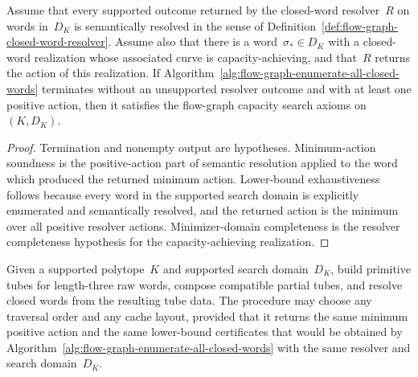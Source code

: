 \begin{unverified}
\begin{proposition}%
\label{prop:enumerate-all-closed-words-satisfies-axioms}
Assume that every supported outcome returned by the closed-word resolver~$R$ on
words in~$D_K$ is semantically resolved in the sense of
Definition~\ref{def:flow-graph-closed-word-resolver}.  Assume also that there
is a word~$\sigma_*\in D_K$ with a closed-word realization whose associated
curve is capacity-achieving, and that~$R$ returns the action of this
realization.
If Algorithm~\ref{alg:flow-graph-enumerate-all-closed-words} terminates without
an unsupported resolver outcome and with at least one positive action, then it
satisfies the flow-graph capacity search axioms on~$(K,D_K)$.
\end{proposition}

\begin{proof}
Termination and nonempty output are hypotheses.  Minimum-action soundness is the
positive-action part of semantic resolution applied to the word which produced
the returned minimum action.  Lower-bound exhaustiveness follows because every
word in the supported search domain is explicitly enumerated and semantically
resolved, and the returned action is the minimum over all positive resolver
actions.
Minimizer-domain completeness is the resolver completeness hypothesis for the
capacity-achieving realization.
\end{proof}
\end{unverified}

\begin{unverified}
\begin{algorithm}\label{alg:flow-graph-cached-tube-search}
Given a supported polytope~$K$ and supported search domain~$D_K$, build
primitive tubes for length-three raw words, compose compatible partial tubes,
and resolve closed words from the resulting tube data.  The procedure may choose
any traversal order and any cache layout, provided that it returns the same
minimum positive action and the same lower-bound certificates that would be
obtained by Algorithm~\ref{alg:flow-graph-enumerate-all-closed-words} with the
same resolver and search domain~$D_K$.
\end{algorithm}
\end{unverified}

